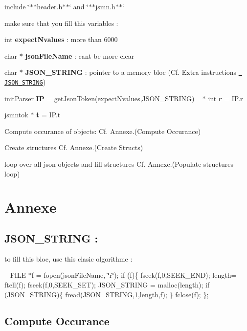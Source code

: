 \begin{DoxyEnumerate}
\item include \char`\"{}$\ast$$\ast$header.\+h$\ast$$\ast$\char`\"{} and \char`\"{}$\ast$$\ast$jsmn.\+h$\ast$$\ast$\char`\"{}
\item make sure that you fill this variables \+:
\end{DoxyEnumerate}
\begin{DoxyItemize}
\item int {\bfseries expect\+Nvalues} \+: more than 6000
\item char $\ast$ {\bfseries json\+File\+Name} \+: can\textquotesingle{}t be more clear
\item char $\ast$ {\bfseries J\+S\+O\+N\+\_\+\+S\+T\+R\+I\+NG} \+: pointer to a memory bloc (Cf. Extra instructions \href{#JSON_STRING}\texttt{ J\+S\+O\+N\+\_\+\+S\+T\+R\+I\+NG})
\item init\+Parser {\bfseries IP} = get\+Json\+Token(expect\+Nvalues,\+J\+S\+O\+N\+\_\+\+S\+T\+R\+I\+N\+G) ~\newline
$\ast$ int {\bfseries r} = I\+P.\+r
\item jsmntok $\ast$ {\bfseries t} = I\+P.\+t
\end{DoxyItemize}
\begin{DoxyEnumerate}
\item Compute occurance of objects\+: Cf. Annexe.(Compute Occurance)
\item Create structures Cf. Annexe.(Create Structs)
\item loop over all json objects and fill structures Cf. Annexe.(Populate structures loop)
\end{DoxyEnumerate}

\section*{Annexe}

\subsection*{J\+S\+O\+N\+\_\+\+S\+T\+R\+I\+NG \+:}

to fill this bloc, use this clasic olgorithme \+:

~\newline
 F\+I\+LE $\ast$f = fopen(json\+File\+Name, \char`\"{}r\char`\"{}); if (f)\{ fseek(f,0,\+S\+E\+E\+K\+\_\+\+E\+N\+D); length= ftell(f); fseek(f,0,\+S\+E\+E\+K\+\_\+\+S\+E\+T); J\+S\+O\+N\+\_\+\+S\+T\+R\+I\+NG = malloc(length); if (J\+S\+O\+N\+\_\+\+S\+T\+R\+I\+NG)\{ fread(\+J\+S\+O\+N\+\_\+\+S\+T\+R\+I\+N\+G,1,length,f); \} fclose(f); \}; \subsection*{Compute Occurance}

